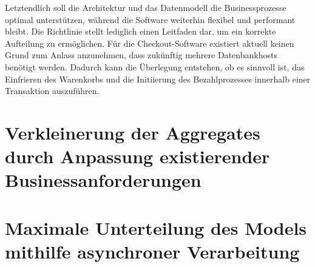 Letztendlich soll die Architektur und das Datenmodell die Businessprozesse optimal unterstützen, während die Software weiterhin flexibel und performant bleibt. Die Richtlinie stellt lediglich einen Leitfaden dar, um ein korrekte Aufteilung zu ermöglichen. Für die Checkout-Software existiert aktuell keinen Grund zum Anlass anzunehmen, dass zukünftig mehrere Datenbankhosts benötigt werden. Dadurch kann die Überlegung entstehen, ob es sinnvoll ist, das Einfrieren des Warenkorbs und die Initiierung des Bezahlprozesses innerhalb einer Transaktion auszuführen. 

\section{Verkleinerung der Aggregates durch Anpassung existierender Businessanforderungen }
\blindtext

\section{Maximale Unterteilung des Models mithilfe asynchroner Verarbeitung }
\blindtext

